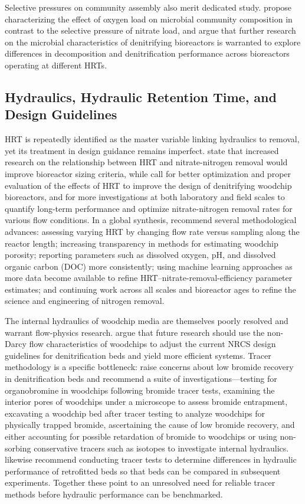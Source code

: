 Selective pressures on community assembly also merit dedicated study. \textcite{Schaefer2021} propose characterizing the effect of oxygen load on microbial community composition in contrast to the selective pressure of nitrate load, and argue that further research on the microbial characteristics of denitrifying bioreactors is warranted to explore differences in decomposition and denitrification performance across bioreactors operating at different HRTs.

\subsection{Hydraulics, Hydraulic Retention Time, and Design Guidelines}
HRT is repeatedly identified as the master variable linking hydraulics to removal, yet its treatment in design guidance remains imperfect. \textcite{Moorman2015} state that increased research on the relationship between HRT and nitrate-nitrogen removal would improve bioreactor sizing criteria, while \textcite{Povilaitis2018} call for better optimization and proper evaluation of the effects of HRT to improve the design of denitrifying woodchip bioreactors, and for more investigations at both laboratory and field scales to quantify long-term performance and optimize nitrate-nitrogen removal rates for various flow conditions. In a global synthesis, \textcite{Christianson2025c} recommend several methodological advances: assessing varying HRT by changing flow rate versus sampling along the reactor length; increasing transparency in methods for estimating woodchip porosity; reporting parameters such as dissolved oxygen, pH, and dissolved organic carbon (DOC) more consistently; using machine learning approaches as more data become available to refine HRT--nitrate-removal-efficiency parameter estimates; and continuing work across all scales and bioreactor ages to refine the science and engineering of nitrogen removal.

The internal hydraulics of woodchip media are themselves poorly resolved and warrant flow-physics research. \textcite{Ghane2016} argue that future research should use the non-Darcy flow characteristics of woodchips to adjust the current NRCS design guidelines for denitrification beds and yield more efficient systems. Tracer methodology is a specific bottleneck: \textcite{Ghane2019b} raise concerns about low bromide recovery in denitrification beds and recommend a suite of investigations---testing for organobromine in woodchips following bromide tracer tests, examining the interior pores of woodchips under a microscope to assess bromide entrapment, excavating a woodchip bed after tracer testing to analyze woodchips for physically trapped bromide, ascertaining the cause of low bromide recovery, and either accounting for possible retardation of bromide to woodchips or using non-sorbing conservative tracers such as isotopes to investigate internal hydraulics. \textcite{Ghane2018} likewise recommend conducting tracer tests to determine differences in hydraulic performance of retrofitted beds so that beds can be compared in subsequent experiments. Together these point to an unresolved need for reliable tracer methods before hydraulic performance can be benchmarked.

